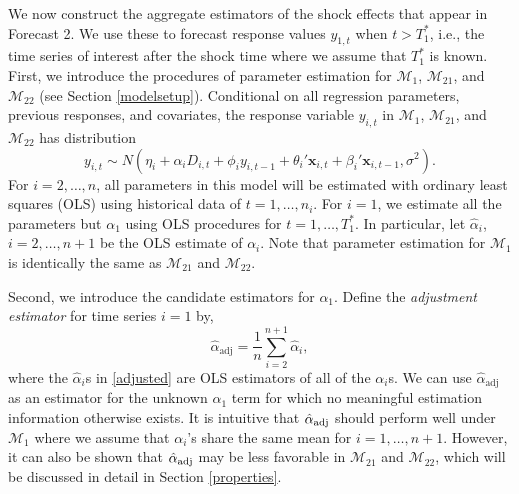 \documentclass[11pt]{article}
\newcommand{\x}{\textbf{x}}
\def\mc#1{\mathcal{#1}} %
\def\E#1{\mathrm{E}(#1)} %
\theoremstyle{definition}
\begin{document}
We now construct the aggregate estimators of the shock effects that appear in 
Forecast 2. We use these to forecast response values $y_{1, t}$ when 
$t > T_1^*$, i.e., the time series of interest after the shock time where we 
assume that $T_1^*$ is known.  %
First, we introduce the procedures of parameter estimation for 
$\mc{M}_1$, $\mc{M}_{21}$, and $\mc{M}_{22}$ (see Section \ref{modelsetup}). 
Conditional on all regression parameters, previous responses, and covariates, 
the response variable $y_{i,t}$ in $\mc{M}_1$, $\mc{M}_{21}$, and $\mc{M}_{22}$ 
has distribution 
$$
  y_{i,t} 
    \sim N(\eta_i + \alpha_iD_{i,t} + \phi_i y_{i,t-1} + \theta_i'\x_{i,t} 
      + \beta_i'\x_{i,t-1}, \sigma^2).
$$
For $i = 2, \ldots, n$, all parameters in this model will be estimated with ordinary least squares 
(OLS) using historical data of $t = 1, \ldots, n_i$. For $i = 1$, we estimate all the parameters but $\alpha_1$ using OLS procedures for $t=1, \ldots, T_1^*$. In particular, let $\hat{\alpha}_i$, $i = 2, \ldots, n+1$ be the OLS estimate 
of $\alpha_i$.  Note that parameter estimation 
for $\mc{M}_1$ is identically the same as $\mc{M}_{21}$ and $\mc{M}_{22}$.  


Second, we introduce the candidate estimators for $\alpha_1$. Define the 
\emph{adjustment estimator} for time series $i=1$ by,
\begin{equation} \label{adjusted}
  \hat{\alpha}_{\text{adj}} = \frac{1}{n}\sum_{i=2}^{n+1}\hat{\alpha}_i,
\end{equation}
where the $\hat{\alpha}_i$s in \eqref{adjusted} are OLS estimators of all of 
the $\alpha_i$s.  We can use $\hat{\alpha}_{\text{adj}}$ as an estimator for 
the unknown $\alpha_1$ term for which no meaningful estimation information 
otherwise exists. It is intuitive that $\hat{\alpha}_{\rm adj}$ should perform 
well under $\mc{M}_1$ where we assume that $\alpha_i$'s share the same mean 
for $i= 1, \ldots, n+1$. However, it can also be shown that 
$\hat{\alpha}_{\rm adj}$ may be less favorable in $\mc{M}_{21}$ 
and $\mc{M}_{22}$, which will be discussed in detail in Section \ref{properties}. 
\end{document}
